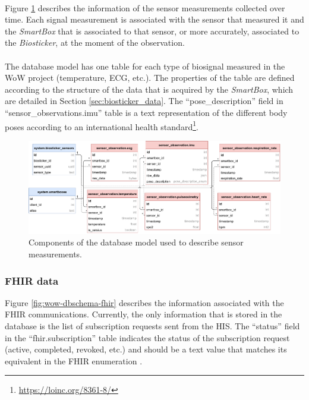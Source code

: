 \paragraph{} Figure \ref{fig:wow-dbschema-sensors} describes the information of the sensor measurements collected over time. Each signal measurement is associated with the sensor that measured it and the \textit{SmartBox} that is associated to that sensor, or more accurately, associated to the \textit{Biosticker}, at the moment of the observation.

\paragraph{} The database model has one table for each type of biosignal measured in the \acs{WoW} project (temperature, \acs{ECG}, etc.). The properties of the table are defined according to the structure of the data that is acquired by the \textit{SmartBox}, which are detailed in Section \ref{sec:biosticker_data}. The ``pose\_description'' field in ``sensor\_observations.imu'' table is a text representation of the different body poses according to an international health standard\footnote{\url{https://loinc.org/8361-8/}}.

\begin{figure}[H]
    \centering
    \includegraphics[width=\linewidth]{images/database-schema-sensordata.pdf}
    \caption{Components of the database model used to describe sensor measurements. }
    \label{fig:wow-dbschema-sensors}
\end{figure}



\subsubsection{\acs{FHIR} data}

Figure \ref{fig:wow-dbschema-fhir} describes the information associated with the \acs{FHIR} communications. Currently, the only information that is stored in the database is the list of subscription requests sent from the \acs{HIS}. The ``status'' field in the ``fhir.subscription'' table indicates the status of the subscription request (active, completed, revoked, etc.) and should be a text value that matches its equivalent in the \acs{FHIR} enumeration \cite{fhir}.

